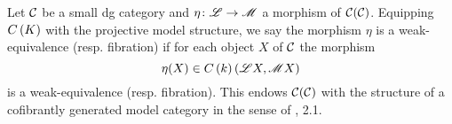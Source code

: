\documentclass[dissertation.tex]{subfiles}
\begin{document}
\begin{defn}
  Let $\mathcal{C}$ be a small dg category and $\eta \colon \mathscr{L} \to \mathscr{M}$ a morphism of $\mathcal{C}(\mathcal{C})$.
  Equipping $C\left(K\right)$ with the projective model structure, we say the morphism $\eta$ is a weak-equivalence (resp. fibration) if for each object $X$ of $\mathcal{C}$ the morphism
  $$\eta(X) \in C\left(k\right)(\mathscr{L}X, \mathscr{M}X)$$
  is a weak-equivalence (resp. fibration).
  This endows $\mathcal{C}(\mathcal{C})$ with the structure of a cofibrantly generated model category in the sense of \cite{Hovey98}, 2.1.
\end{defn}
\end{document}
